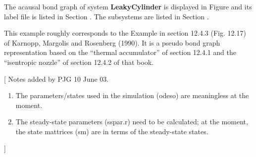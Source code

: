 

   The acausal bond graph of system \textbf{LeakyCylinder} is
   displayed in Figure  and its label
   file is listed in Section .
   The subsystems are listed in Section .

This example roughly corresponds to the Example in section 12.4.3
(Fig. 12.17) of Karnopp, Margolis and Rosenberg (1990). It is a pseudo bond
graph representation based on the ``thermal accumulator'' of  section
12.4.1 and the ``isentropic nozzle'' of section 12.4.2 of that book.

[
Notes added by PJG 10 June 03. 
\begin{enumerate}
\item The parameters/states used in the simulation (odeso) are
  meaningless at the moment.
\item The steady-state parameters (sspar.r) need to be calculated; at
  the moment, the state mattrices (sm) are in terms of the
  steady-state states.  
\end{enumerate}
]
